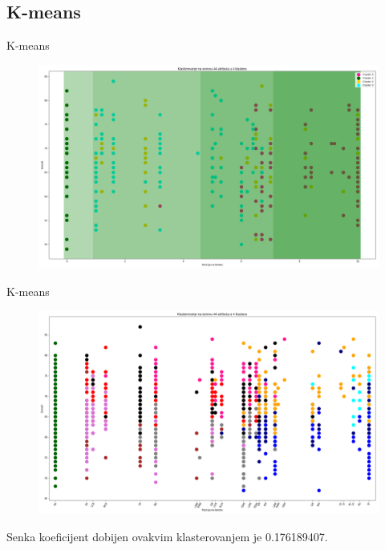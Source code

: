 \documentclass[12pt]{beamer}
\begin{document}
\subsection{K-means}
\begin{frame}{K-means}
\begin{figure}
\includegraphics[scale=0.2]{../position_clustering}
\end{figure}
\end{frame}

\begin{frame}{K-means}
\begin{figure}
\includegraphics[scale=0.15]{../kmeans_11}
\end{figure}
Senka koeficijent dobijen ovakvim klasterovanjem je 0.176189407.
\end{frame}
\end{document}
